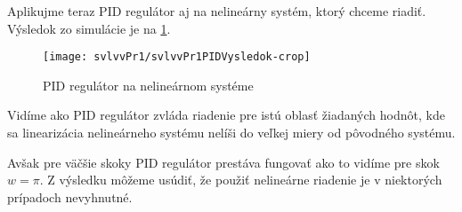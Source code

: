 \documentclass[../main.tex]{subfiles}
\begin{document}
	Aplikujme teraz PID regulátor aj na nelineárny systém, ktorý chceme riadiť. Výsledok zo simulácie je na \cref{fig:svlvPr1VysledokPID}.
		\begin{figure}[h!]
			\centering
		\texttt{[image: svlvvPr1/svlvvPr1PIDVysledok-crop]}
		\caption{PID regulátor na nelineárnom systéme}
		\label{fig:svlvPr1VysledokPID}
	\end{figure}

    Vidíme ako PID regulátor zvláda riadenie pre istú oblasť žiadaných hodnôt, kde sa linearizácia nelineárneho systému nelíši do veľkej miery od pôvodného systému.

    Avšak pre väčšie skoky PID regulátor prestáva fungovať ako to vidíme pre skok $w=\pi$.
	Z výsledku môžeme usúdiť, že použiť nelineárne riadenie je v niektorých prípadoch nevyhnutné.
\end{document}
